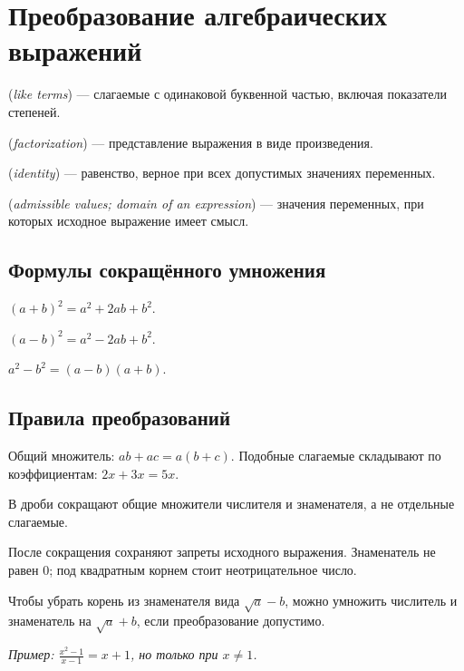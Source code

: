 \chapter{Преобразование алгебраических выражений}\label{chap:c09}
\begin{definition} (\emph{like terms}) — слагаемые с одинаковой буквенной частью, включая показатели степеней.\end{definition}
\begin{definition} (\emph{factorization}) — представление выражения в виде произведения.\end{definition}
\begin{definition} (\emph{identity}) — равенство, верное при всех допустимых значениях переменных.\end{definition}
\begin{definition} (\emph{admissible values; domain of an expression}) — значения переменных, при которых исходное выражение имеет смысл.\end{definition}
\section{Формулы сокращённого умножения}
\((a + b)^{2} = a^{2} + 2 ab + b^{2}\).\par
\((a - b)^{2} = a^{2} - 2 ab + b^{2}\).\par
\(a^{2} - b^{2} = (a - b) (a + b)\).\par
\section{Правила преобразований}
Общий множитель: \(ab + ac = a (b + c)\). Подобные слагаемые складывают по коэффициентам: \(2 x + 3 x = 5 x\).\par
В дроби сокращают общие множители числителя и знаменателя, а не отдельные слагаемые.\par
После сокращения сохраняют запреты исходного выражения. Знаменатель не равен \(0\); под квадратным корнем стоит неотрицательное число.\par
Чтобы убрать корень из знаменателя вида \(\sqrt{a} - b\), можно умножить числитель и знаменатель на \(\sqrt{a} + b\), если преобразование допустимо.\par
{\small\textit{Пример: \(\frac{x^{2} - 1}{x - 1} = x + 1\), но только при \(x \ne  1\).}}\par

